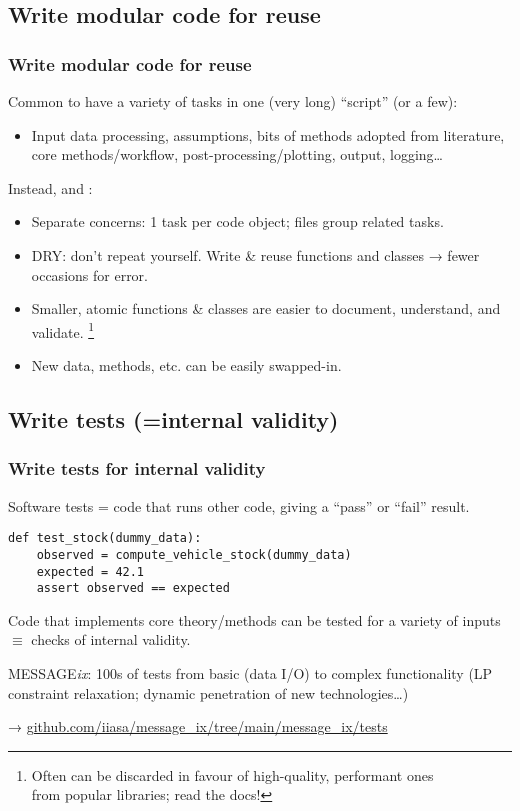 \documentclass[12pt,aspectratio=169]{beamer}
\begin{document}
\subsection{Write modular code for reuse}
\begin{frame}
\frametitle{Write modular code for reuse}

Common to have a variety of tasks in one (very long) “script” (or a few):
\begin{itemize}
  \item Input data processing, assumptions, bits of methods adopted from literature, core methods/workflow, post-processing/plotting, output, logging…
\end{itemize}

\bigskip
Instead, and :
\begin{itemize}
  \item Separate concerns: 1 task per code object; files group related tasks.
  \item DRY: don't repeat yourself. Write \& reuse functions and classes → fewer occasions for error.
  \item Smaller, atomic functions \& classes are easier to document, understand, and validate.%
    \footnote{Often can be discarded in favour of high-quality, performant ones\\ \hspace{25mm} from popular libraries; read the docs!}
  \item New data, methods, etc. can be easily swapped-in.
\end{itemize}

\end{frame}

\subsection{Write tests (=internal validity)}
\begin{frame}[fragile]
\frametitle{Write tests for internal validity}

Software tests = code that runs other code, giving a “pass” or “fail” result.

\smallskip
\begin{verbatim}
def test_stock(dummy_data):
    observed = compute_vehicle_stock(dummy_data)
    expected = 42.1
    assert observed == expected
\end{verbatim}

\smallskip
Code that implements core theory/methods can be tested for a variety of inputs $\equiv$ checks of internal validity.

\bigskip
MESSAGE\emph{ix}: 100s of tests from basic (data I/O) to complex functionality (LP constraint relaxation; dynamic penetration of new technologies…)

→ \href{https://github.com/iiasa/message_ix/tree/main/message_ix/tests}{github.com/iiasa/message\_ix/tree/main/message\_ix/tests}

\end{frame}
\end{document}
